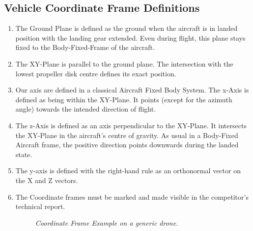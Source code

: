 \documentclass{article}
\begin{document}
\subsection{Vehicle Coordinate Frame Definitions}
\begin{enumerate}
  \item The Ground Plane is defined as the ground when the aircraft is in landed position with the landing gear extended. Even during flight, this plane stays fixed to the Body-Fixed-Frame of the aircraft.
  \item The XY-Plane is parallel to the ground plane. The intersection with the lowest propeller disk centre defines its exact position.
  \item Our axis are defined in a classical Aircraft Fixed Body System. The x-Axis is defined as being within the XY-Plane. It points (except for the azimuth angle) towards the intended direction of flight.
  \item The z-Axis is defined as an axis perpendicular to the XY-Plane. It intersects the XY-Plane in the aircraft's centre of gravity. As usual in a Body-Fixed Aircraft frame, the positive direction points downwards during the landed state.
  \item The y-axis is defined with the right-hand rule as an orthonormal vector on the X and Z vectors.
  \item The Coordinate frames must be marked and made visible in the competitor's technical report. 
  
  \begin{figure}[h!]
    \centering
   \caption{\textit{Coordinate Frame Example on a generic drone.}}
   \end{figure}
\end{enumerate}
\end{document}

